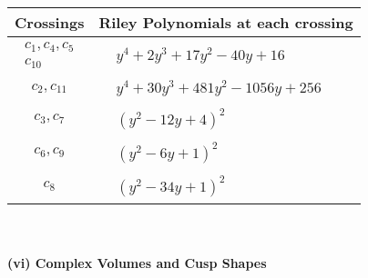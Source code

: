 \documentclass[1p]{elsarticle_modified}
\theoremstyle{definition}
\begin{document}
\begin{tabular}{m{50pt}|m{274pt}}
Crossings & \hspace{64pt}Riley Polynomials at each crossing \\
\hline $$\begin{aligned}c_{1},c_{4},c_{5}\\c_{10}\end{aligned}$$&$\begin{aligned}
&y^4+2 y^3+17 y^2-40 y+16
\end{aligned}$\\
\hline $$\begin{aligned}c_{2},c_{11}\end{aligned}$$&$\begin{aligned}
&y^4+30 y^3+481 y^2-1056 y+256
\end{aligned}$\\
\hline $$\begin{aligned}c_{3},c_{7}\end{aligned}$$&$\begin{aligned}
&(y^2-12 y+4)^2
\end{aligned}$\\
\hline $$\begin{aligned}c_{6},c_{9}\end{aligned}$$&$\begin{aligned}
&(y^2-6 y+1)^2
\end{aligned}$\\
\hline $$\begin{aligned}c_{8}\end{aligned}$$&$\begin{aligned}
&(y^2-34 y+1)^2
\end{aligned}$\\
\hline
\end{tabular}\\~\\
\newpage\flushleft \textbf{(vi) Complex Volumes and Cusp Shapes}
\end{document}

